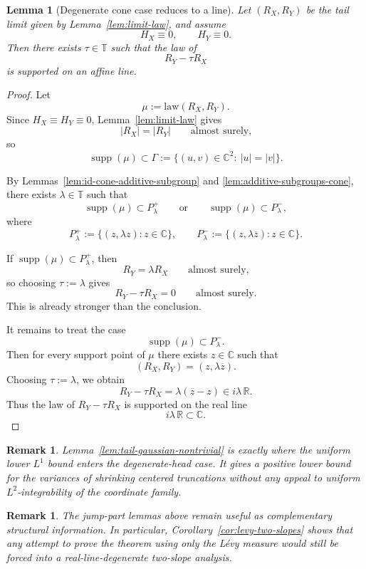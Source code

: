 \documentclass[11pt]{amsart}
\newtheorem{lemma}[theorem]{Lemma}
\newtheorem{remark}[theorem]{Remark}
\newcommand{\C}{\mathbb{C}}
\newcommand{\R}{\mathbb{R}}
\newcommand{\T}{\mathbb{T}}
\newcommand{\supp}{\operatorname{supp}}
\begin{document}
\begin{lemma}[Degenerate cone case reduces to a line]
\label{lem:degenerate-cone-line-reduction}
Let $(R_X,R_Y)$ be the tail limit given by Lemma~\ref{lem:limit-law}, and
assume
\[
  H_X\equiv 0,
  \qquad
  H_Y\equiv 0.
\]
Then there exists $\tau\in\T$ such that the law of
\[
  R_Y-\tau R_X
\]
is supported on an affine line.
\end{lemma}

\begin{proof}
Let
\[
  \mu:=\text{law}(R_X,R_Y).
\]
Since $H_X\equiv H_Y\equiv 0$, Lemma~\ref{lem:limit-law} gives
\[
  |R_X|=|R_Y|
  \qquad\text{almost surely,}
\]
so
\[
  \supp(\mu)\subset \Gamma:=\{(u,v)\in\C^2:\ |u|=|v|\}.
\]

By Lemmas~\ref{lem:id-cone-additive-subgroup} and
\ref{lem:additive-subgroups-cone}, there exists $\lambda\in\T$ such that
\[
  \supp(\mu)\subset P_\lambda^+
  \qquad\text{or}\qquad
  \supp(\mu)\subset P_\lambda^-,
\]
where
\[
  P_\lambda^+:=\{(z,\lambda z): z\in\C\},
  \qquad
  P_\lambda^-:=\{(z,\lambda \overline z): z\in\C\}.
\]

If $\supp(\mu)\subset P_\lambda^+$, then
\[
  R_Y=\lambda R_X
  \qquad\text{almost surely,}
\]
so choosing $\tau:=\lambda$ gives
\[
  R_Y-\tau R_X=0
  \qquad\text{almost surely.}
\]
This is already stronger than the conclusion.

It remains to treat the case
\[
  \supp(\mu)\subset P_\lambda^-.
\]
Then for every support point of $\mu$ there exists $z\in\C$ such that
\[
  (R_X,R_Y)=(z,\lambda\overline z).
\]
Choosing $\tau:=\lambda$, we obtain
\[
  R_Y-\tau R_X
  =
  \lambda(\overline z-z)
  \in
  i\lambda\,\R.
\]
Thus the law of $R_Y-\tau R_X$ is supported on the real line
\[
  i\lambda\,\R\subset\C.
\]
\end{proof}

\begin{remark}
Lemma~\ref{lem:tail-gaussian-nontrivial} is exactly where the uniform lower
$L^1$ bound enters the degenerate-head case.  It gives a positive lower bound
for the variances of shrinking centered truncations without any appeal to
uniform $L^2$-integrability of the coordinate family.
\end{remark}

\begin{remark}
The jump-part lemmas above remain useful as complementary structural
information.  In particular, Corollary~\ref{cor:levy-two-slopes} shows that any
attempt to prove the theorem using only the L\'evy measure would still be
forced into a real-line-degenerate two-slope analysis.
\end{remark}
\end{document}
